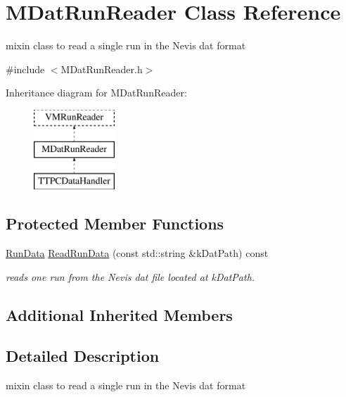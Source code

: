\hypertarget{class_m_dat_run_reader}{\section{M\+Dat\+Run\+Reader Class Reference}
\label{class_m_dat_run_reader}
}


mixin class to read a single run in the Nevis dat format  




{\ttfamily \#include $<$M\+Dat\+Run\+Reader.\+h$>$}

Inheritance diagram for M\+Dat\+Run\+Reader\+:\begin{figure}[H]
\begin{center}
\leavevmode
\includegraphics[height=3.000000cm]{class_m_dat_run_reader}
\end{center}
\end{figure}
\subsection*{Protected Member Functions}
\begin{DoxyCompactItemize}
\item 
\hyperlink{class_v_m_run_reader_aa84c99e50235a10f563b3487b3930602}{Run\+Data} \hyperlink{class_m_dat_run_reader_ad9693d690fe452e2839bffe917d0ae41}{Read\+Run\+Data} (const std\+::string \&k\+Dat\+Path) const 
\begin{DoxyCompactList}\small\item\em reads one run from the Nevis dat file located at k\+Dat\+Path. \end{DoxyCompactList}\end{DoxyCompactItemize}
\subsection*{Additional Inherited Members}


\subsection{Detailed Description}
mixin class to read a single run in the Nevis dat format 

